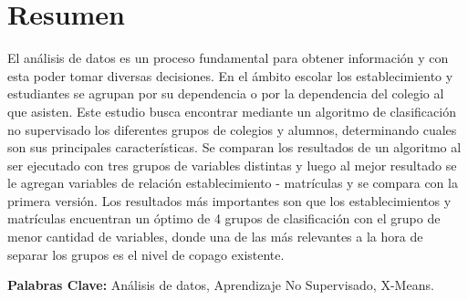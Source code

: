 \chapter*{Resumen}

El análisis de datos es un proceso fundamental para obtener información y con esta poder tomar diversas decisiones. En el ámbito escolar los establecimiento y estudiantes se agrupan por su dependencia o por la dependencia del colegio al que asisten. Este estudio busca encontrar mediante un algoritmo de clasificación no supervisado los diferentes grupos de colegios y alumnos, determinando cuales son sus principales características. Se comparan los resultados de un algoritmo al ser ejecutado con tres grupos de variables distintas y luego al mejor resultado se le agregan variables de relación establecimiento - matrículas y se compara con la primera versión. Los resultados más importantes son que los establecimientos y matrículas encuentran un óptimo de 4 grupos de clasificación con el grupo de menor cantidad de variables, donde una de las más relevantes a la hora de separar los grupos es el nivel de copago existente. 

\textbf{Palabras Clave:} Análisis de datos, Aprendizaje No Supervisado, X-Means.